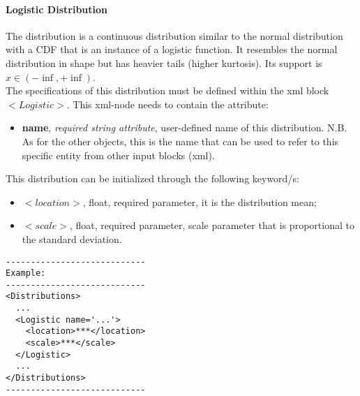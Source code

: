 \paragraph{Logistic Distribution}
\label{Logistic}
The  distribution is a continuous distribution
similar to the normal distribution with a CDF that is an instance of a
logistic function. It resembles the normal distribution in shape but has heavier tails (higher kurtosis). Its support is $x \in (-\inf,+\inf)$.
\\ The specifications of this distribution must be defined within the xml block $<Logistic>$. This xml-node needs to contain the attribute:
\vspace{-5mm}
\begin{itemize}
\itemsep0em
\item \textbf{name}, \textit{required string attribute}, user-defined name of this distribution. N.B. As for the other objects, this is the name that can be used to refer to this specific entity from other input blocks (xml).   
\end{itemize}
\vspace{-5mm}
This distribution can be initialized through the following keyword/s:
\begin{itemize}
\item $<location>$, float, required parameter, it is the distribution mean;
\item $<scale>$, float, required parameter, scale parameter that is proportional to the standard deviation.
\end{itemize}

\begin{lstlisting}[style=XML]
----------------------------
Example:
----------------------------
<Distributions>
  ...
  <Logistic name='...'>
    <location>***</location>
    <scale>***</scale>
  </Logistic>
  ...
</Distributions>
----------------------------
\end{lstlisting}
 

